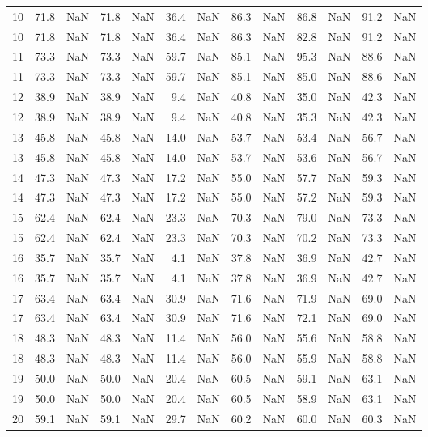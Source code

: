 \begin{tabular}{lrrrrrrrrrrrr}
10 & 71.8 & NaN & 71.8 & NaN & 36.4 & NaN & 86.3 & NaN & 86.8 & NaN & 91.2 & NaN \\
10 & 71.8 & NaN & 71.8 & NaN & 36.4 & NaN & 86.3 & NaN & 82.8 & NaN & 91.2 & NaN \\
11 & 73.3 & NaN & 73.3 & NaN & 59.7 & NaN & 85.1 & NaN & 95.3 & NaN & 88.6 & NaN \\
11 & 73.3 & NaN & 73.3 & NaN & 59.7 & NaN & 85.1 & NaN & 85.0 & NaN & 88.6 & NaN \\
12 & 38.9 & NaN & 38.9 & NaN & 9.4 & NaN & 40.8 & NaN & 35.0 & NaN & 42.3 & NaN \\
12 & 38.9 & NaN & 38.9 & NaN & 9.4 & NaN & 40.8 & NaN & 35.3 & NaN & 42.3 & NaN \\
13 & 45.8 & NaN & 45.8 & NaN & 14.0 & NaN & 53.7 & NaN & 53.4 & NaN & 56.7 & NaN \\
13 & 45.8 & NaN & 45.8 & NaN & 14.0 & NaN & 53.7 & NaN & 53.6 & NaN & 56.7 & NaN \\
14 & 47.3 & NaN & 47.3 & NaN & 17.2 & NaN & 55.0 & NaN & 57.7 & NaN & 59.3 & NaN \\
14 & 47.3 & NaN & 47.3 & NaN & 17.2 & NaN & 55.0 & NaN & 57.2 & NaN & 59.3 & NaN \\
15 & 62.4 & NaN & 62.4 & NaN & 23.3 & NaN & 70.3 & NaN & 79.0 & NaN & 73.3 & NaN \\
15 & 62.4 & NaN & 62.4 & NaN & 23.3 & NaN & 70.3 & NaN & 70.2 & NaN & 73.3 & NaN \\
16 & 35.7 & NaN & 35.7 & NaN & 4.1 & NaN & 37.8 & NaN & 36.9 & NaN & 42.7 & NaN \\
16 & 35.7 & NaN & 35.7 & NaN & 4.1 & NaN & 37.8 & NaN & 36.9 & NaN & 42.7 & NaN \\
17 & 63.4 & NaN & 63.4 & NaN & 30.9 & NaN & 71.6 & NaN & 71.9 & NaN & 69.0 & NaN \\
17 & 63.4 & NaN & 63.4 & NaN & 30.9 & NaN & 71.6 & NaN & 72.1 & NaN & 69.0 & NaN \\
18 & 48.3 & NaN & 48.3 & NaN & 11.4 & NaN & 56.0 & NaN & 55.6 & NaN & 58.8 & NaN \\
18 & 48.3 & NaN & 48.3 & NaN & 11.4 & NaN & 56.0 & NaN & 55.9 & NaN & 58.8 & NaN \\
19 & 50.0 & NaN & 50.0 & NaN & 20.4 & NaN & 60.5 & NaN & 59.1 & NaN & 63.1 & NaN \\
19 & 50.0 & NaN & 50.0 & NaN & 20.4 & NaN & 60.5 & NaN & 58.9 & NaN & 63.1 & NaN \\
20 & 59.1 & NaN & 59.1 & NaN & 29.7 & NaN & 60.2 & NaN & 60.0 & NaN & 60.3 & NaN \\

\end{tabular}
